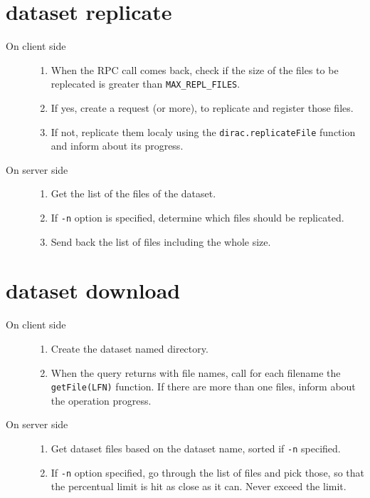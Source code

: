 \documentclass{scrreprt}
\begin{document}
\section{dataset replicate} 
\begin{description}

%
\item[On client side] \hfill
\begin{enumerate}
\item When the RPC call comes back, check if the size of the files to be replecated is greater than \texttt{MAX_REPL_FILES}.
\item If yes, create a request (or more), to replicate and register those files.
\item If not, replicate them localy using the \texttt{dirac.replicateFile} function and inform about its progress.
\end{enumerate}
%
\item[On server side] \hfill
\begin{enumerate} 
\item Get the list of the files of the dataset.
\item If \texttt{-n} option is specified, determine which files should be replicated.
\item Send back the list of files including the whole size.

\end{enumerate}

\end{description}



\section{dataset download} 
\begin{description}

%
\item[On client side] \hfill
\begin{enumerate} 
\item Create the dataset named directory. 
\item When the query returns with file names, call for each filename the \texttt{getFile(LFN)} function. If there are more than one files, inform about the operation progress.

\end{enumerate}
%
\item[On server side] \hfill
\begin{enumerate} 
\item Get dataset files based on the dataset name, sorted if \texttt{-n} specified.
\item If \texttt{-n} option specified, go through the list of files and pick those, so that the percentual limit is hit as close as it can. Never exceed the limit.

\end{enumerate}

\end{description}
\end{document}
